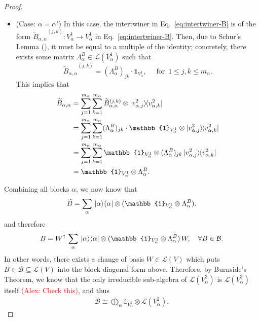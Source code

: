 \documentclass[12pt]{article}
\theoremstyle{plain}
\newcommand{\proj}[1]{\ket{#1}\!\bra{#1}}
\newcommand{\AlexNote}[1]{\textcolor{red}{(Alex: #1)}}
\newcommand{\AlexNote}[1]{}
\begin{document}
\begin{proof}
\begin{itemize}
    \item (Case: $\alpha = \alpha'$) In this case, the intertwiner in Eq.~\eqref{eq:intertwiner-B} is of the form ${\widetilde{B}_{\alpha,\alpha}}^{(j,k)}:V_\alpha^1 \rightarrow V_{\alpha}^1$ in Eq.~\eqref{eq:intertwiner-B}. Then, due to Schur's Lemma (), it must be equal to a multiple of the identity; concretely, there exists some matrix $\Lambda_\alpha^B \in \mathcal{L}(V_\alpha^1)$ such that
    $$
    {\widetilde{B}_{\alpha,\alpha}}^{(j,k)} = (\Lambda_\alpha^B)_{jk} \cdot \mathbb{1}_{V_\alpha^1}, \quad \text{ for } \, 1 \leq j,k \leq m_\alpha.
    $$
\noindent This implies that
    \begin{align}
\widetilde{B}_{\alpha,\alpha} &= \sum_{j=1}^{m_\alpha} \sum_{k=1}^{m_{\alpha}}   {\widetilde{B}_{\alpha,\alpha}}^{(j,k)} \otimes \ket{v_{\alpha,j}^2} \hspace{-1mm}\bra{v_{\alpha,k}^2}\\
&=\sum_{j=1}^{m_\alpha} \sum_{k=1}^{m_{\alpha}}   (\Lambda_\alpha^B)_{jk} \cdot \mathbb{1}_{V_\alpha^1} \otimes \ket{v_{\alpha,j}^2} \hspace{-1mm}\bra{v_{\alpha,k}^2}\\
&=\sum_{j=1}^{m_\alpha} \sum_{k=1}^{m_{\alpha}}  \mathbb{1}_{V_\alpha^1} \otimes (\Lambda_\alpha^B)_{jk} \ket{v_{\alpha,j}^2} \hspace{-1mm}\bra{v_{\alpha,k}^2}\\
&= \mathbb{1}_{V_\alpha^1} \otimes \Lambda_\alpha^B.
\end{align}
\end{itemize}
Combining all blocks $\alpha$, we now know that
\begin{align}
\widetilde{B} = \sum_\alpha  \,\proj{\alpha} \otimes (\mathbb{1}_{V_\alpha^1} \otimes \Lambda_\alpha^B).   
\end{align}
and therefore
\begin{align}
B = W^\dag \, \sum_\alpha  \,\proj{\alpha} \otimes (\mathbb{1}_{V_\alpha^1} \otimes \Lambda_\alpha^B) \, W, \quad \forall B \in \mathcal{B}.   
\end{align}
In other words, there exists a change of basis $W \in \mathcal{L}(V)$ which puts $B \in \mathcal{B} \subseteq \mathcal{L}(V)$ into the block diagonal form above. Therefore, by Burnside's Theorem, we know that the only irreducible sub-algebra of $\mathcal{L}(V_\alpha^2)$ is $\mathcal{L}(V_\alpha^2)$ itself \AlexNote{Check this}, and thus
\begin{align}
\mathcal{B} \cong \bigoplus_{\alpha} \mathbb{1}_{V^1_\alpha} \otimes \mathcal{L}(V^2_\alpha).    
\end{align}
\end{proof}
\end{document}
